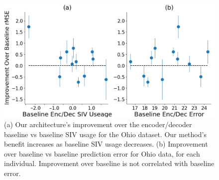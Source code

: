 \documentclass[letterpaper]{article}
\begin{document}
\begin{figure}[t]
 \centering 
 \hspace*{-.15cm} \includegraphics[height=1.8 in]{plotsR.png}
\caption{(a) Our architecture's improvement over the encoder/decoder baseline vs baseline SIV usage for the Ohio dataset. Our method's benefit increases as baseline SIV usage decreases. (b) Improvement over baseline vs baseline prediction error for Ohio data, for each individual. Improvement over baseline is not correlated with baseline error.  }\label{fig:useerrR}
\end{figure}



\begin{table}
  \centering 
  

\setlength{\tabcolsep}{2pt}
\hspace*{0cm}
\caption{rMSE and MAE, with SIV usage, for each ablation. Outcomes are reported as: Error [95\% confidence interval] (SIV Usage). Confidence intervals were calculated from bootstraps with 1,000 resamples. }\label{syn1}
  \label{syn1} \label{mode1ablR}
\end{table}
\newpage
\end{document}
